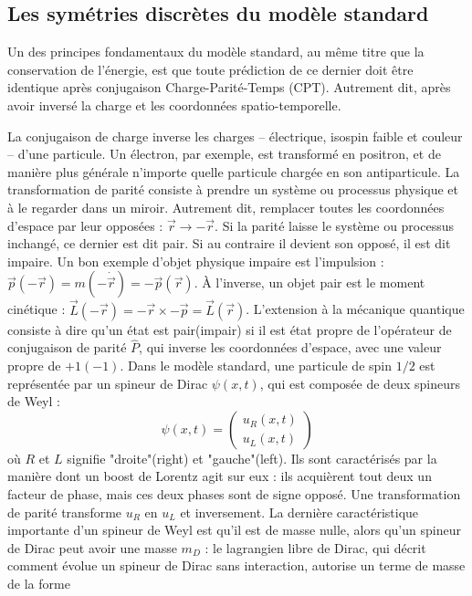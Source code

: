 		\subsection{Les symétries discrètes du modèle standard}\label{sec::CP}
		
			Un des principes fondamentaux du modèle standard, au même titre que la conservation de l'énergie, est que toute prédiction de ce dernier doit être identique après conjugaison Charge-Parité-Temps (CPT). Autrement dit, après avoir inversé la charge et les coordonnées spatio-temporelle.
			
			La conjugaison de charge inverse les charges -- électrique, isospin faible et couleur -- d'une particule. Un électron, par exemple, est transformé en positron, et de manière plus générale n'importe quelle particule chargée en son antiparticule. La transformation de parité consiste à prendre un système ou processus physique  et à le regarder dans un miroir. Autrement dit, remplacer toutes les coordonnées d'espace par leur opposées : $\Vec{r}\to-\Vec{r}$. Si la parité laisse le système ou processus inchangé, ce dernier est dit pair. Si au contraire il devient son opposé, il est dit impaire. Un bon exemple d'objet physique impaire est l'impulsion : $\Vec{p}(-\Vec{r}) = m(-\dot{\Vec{r}}) = -\Vec{p}(\Vec{r})$. À l'inverse, un objet pair est le moment cinétique : $\Vec{L}(-\Vec{r}) = -\Vec{r}\times -\Vec{p} = \Vec{L}(\Vec{r})$. L'extension à la mécanique quantique consiste à dire qu'un état est pair(impair) si il est état propre de l'opérateur de conjugaison de parité $\hat{P}$, qui inverse les coordonnées d'espace, avec une valeur propre de $+1(-1)$. Dans le modèle standard, une particule de spin $1/2$ est représentée par un spineur de Dirac $\psi(x,t)$, qui est composée de deux spineurs de Weyl :
			\begin{equation}
			\psi(x,t)=\left(\begin{matrix} u_R(x,t) \\ u_L(x,t)\end{matrix}\right)
			\end{equation}
			où $R$ et $L$ signifie "droite"(right) et "gauche"(left). Ils sont caractérisés par la manière dont un boost de Lorentz agit sur eux : ils acquièrent tout deux un facteur de phase, mais ces deux phases sont de signe opposé. Une transformation de parité transforme $u_R$ en $u_L$ et inversement. La dernière caractéristique importante d'un spineur de Weyl est qu'il est de masse nulle, alors qu'un spineur de Dirac peut avoir une masse $m_D$ : le lagrangien libre de Dirac, qui décrit comment évolue un spineur de Dirac sans interaction, autorise un terme de masse de la forme

